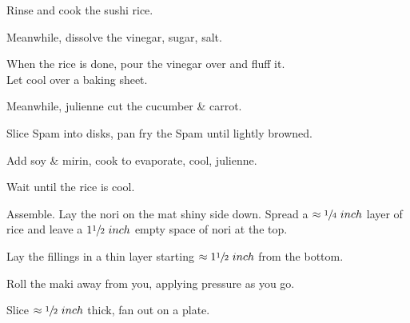 \begin{preparation}
\item Rinse and cook the sushi rice.
\item Meanwhile, dissolve the vinegar, sugar, salt.
\item When the rice is done, pour the vinegar over and fluff it.\\
    Let cool over a baking sheet.
\item Meanwhile, julienne cut the cucumber \& carrot.
\item Slice Spam into disks, pan fry the Spam until lightly browned.
\item Add soy \& mirin, cook to evaporate, cool, julienne.
\item Wait until the rice is cool.
\item Assemble. Lay the nori on the mat shiny side down. Spread a $\approx\sfrac{1}{4}~inch$ layer of rice and
    leave a $1 \sfrac{1}{2}~inch$ empty space of nori at the top.
\item Lay the fillings in a thin layer starting $\approx1\sfrac{1}{2}~inch$ from the bottom.
\item Roll the maki away from you, applying pressure as you go.
\item Slice $\approx\sfrac{1}{2}~inch$ thick, fan out on a plate.
\end{preparation}

\recipeend%
